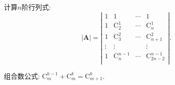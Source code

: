 \documentclass[lang=cn,newtx,10pt,scheme=chinese]{elegantbook}
\begin{document}
\begin{exercise}
    计算$n$阶行列式:
    \begin{equation}
        |\boldsymbol{A}|=\left| \begin{matrix}
        1&		1&		\cdots&		1\\
        1&		\mathrm{C}_{2}^{1}&		\cdots&		\mathrm{C}_{n}^{1}\\
        1&		\mathrm{C}_{3}^{2}&		\cdots&		\mathrm{C}_{n+1}^{2}\\
        \vdots&		\vdots&		&		\vdots\\
        1&		\mathrm{C}_{n}^{n-1}&		\cdots&		\mathrm{C}_{2n-2}^{n-1}\\
    \end{matrix} \right|.
        \nonumber
    \end{equation}
    \begin{note}
        组合数公式:
        $\mathrm{C}_{m}^{k-1}+\mathrm{C}_{m}^{k}=\mathrm{C}_{m+1}^{k}$.
        

\end{note}
\end{exercise}
\end{document}
